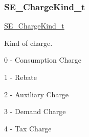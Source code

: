 \subsubsection{\texorpdfstring{S\+E\+\_\+\+Charge\+Kind\+\_\+t}{SE\_ChargeKind\_t}}
{\footnotesize\ttfamily \hyperlink{group__ChargeKind_gac33236bd52e13aede011017e581420b8}{S\+E\+\_\+\+Charge\+Kind\+\_\+t}}

Kind of charge.

0 -\/ Consumption Charge

1 -\/ Rebate

2 -\/ Auxiliary Charge

3 -\/ Demand Charge

4 -\/ Tax Charge 